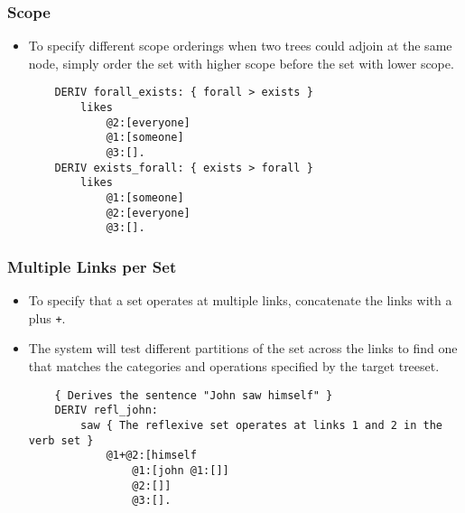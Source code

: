 \documentclass[10.5pt]{article}
\newcommand{\code}[1]{\texttt{#1}}
\begin{document}
\subsubsection{Scope}
  \begin{itemize}
	\item To specify different scope orderings when two trees could adjoin at the same node,
	  simply order the set with higher scope before the set with lower scope.
	
	\begin{mdframed}[backgroundcolor=blue!5] 
	\begin{verbatim}
	DERIV forall_exists: { forall > exists }
	    likes 
	        @2:[everyone]
	        @1:[someone]
	        @3:[].
	DERIV exists_forall: { exists > forall }
	    likes 
	        @1:[someone]
	        @2:[everyone]
	        @3:[].
	\end{verbatim}
	\end{mdframed}
  \end{itemize}

\subsubsection{Multiple Links per Set}
  \begin{itemize}
	\item To specify that a set operates at multiple links, concatenate the links with a plus \code{+}.
	\item The system will test different partitions of the set across the links to find one that matches the categories and operations specified by the target treeset.
	
	\begin{mdframed}[backgroundcolor=blue!5] 
	\begin{verbatim}
	{ Derives the sentence "John saw himself" } 
	DERIV refl_john:
	    saw { The reflexive set operates at links 1 and 2 in the verb set }
		    @1+@2:[himself
	            @1:[john @1:[]]
	            @2:[]]
	            @3:[].
	\end{verbatim}
	\end{mdframed}
  \end{itemize}
\end{document}
